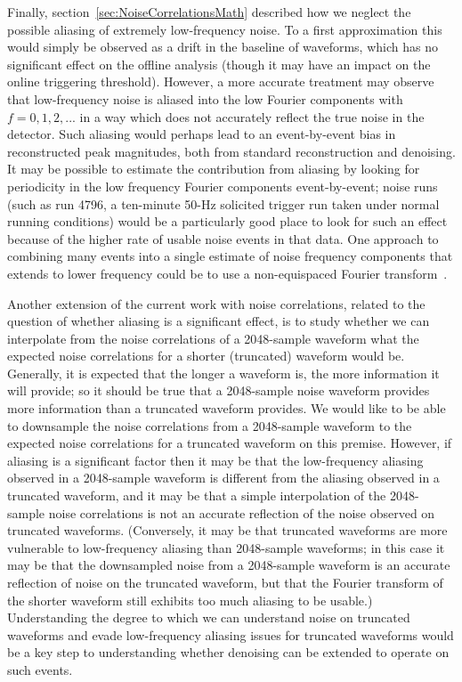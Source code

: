 Finally, section~\ref{sec:NoiseCorrelationsMath} described how we neglect the possible aliasing of extremely low-frequency noise.  To a first approximation this would simply be observed as a drift in the baseline of waveforms, which has no significant effect on the offline analysis (though it may have an impact on the online triggering threshold).  However, a more accurate treatment may observe that low-frequency noise is aliased into the low Fourier components with $f = 0, 1, 2, ...$ in a way which does not accurately reflect the true noise in the detector.  Such aliasing would perhaps lead to an event-by-event bias in reconstructed peak magnitudes, both from standard reconstruction and denoising.  It may be possible to estimate the contribution from aliasing by looking for periodicity in the low frequency Fourier components event-by-event; noise runs (such as run 4796, a ten-minute 50-Hz solicited trigger run taken under normal running conditions) would be a particularly good place to look for such an effect because of the higher rate of usable noise events in that data.  One approach to combining many events into a single estimate of noise frequency components that extends to lower frequency could be to use a non-equispaced Fourier transform~\cite{Keiner:2009:UNS:1555386.1555388}.

Another extension of the current work with noise correlations, related to the question of whether aliasing is a significant effect, is to study whether we can interpolate from the noise correlations of a 2048-sample waveform what the expected noise correlations for a shorter (truncated) waveform would be.  Generally, it is expected that the longer a waveform is, the more information it will provide; so it should be true that a 2048-sample noise waveform provides more information than a truncated waveform provides.  We would like to be able to downsample the noise correlations from a 2048-sample waveform to the expected noise correlations for a truncated waveform on this premise.  However, if aliasing is a significant factor then it may be that the low-frequency aliasing observed in a 2048-sample waveform is different from the aliasing observed in a truncated waveform, and it may be that a simple interpolation of the 2048-sample noise correlations is not an accurate reflection of the noise observed on truncated waveforms.  (Conversely, it may be that truncated waveforms are more vulnerable to low-frequency aliasing than 2048-sample waveforms; in this case it may be that the downsampled noise from a 2048-sample waveform is an accurate reflection of noise on the truncated waveform, but that the Fourier transform of the shorter waveform still exhibits too much aliasing to be usable.)  Understanding the degree to which we can understand noise on truncated waveforms and evade low-frequency aliasing issues for truncated waveforms would be a key step to understanding whether denoising can be extended to operate on such events.

